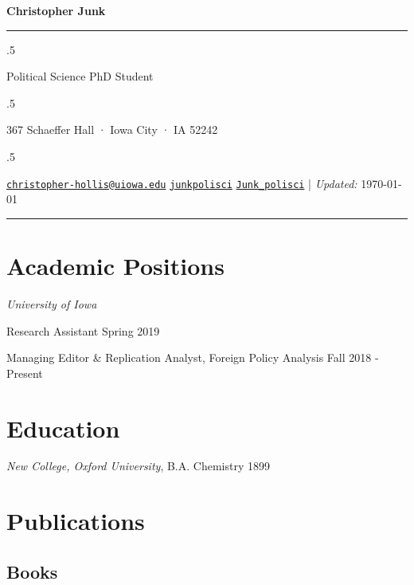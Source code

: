 \documentclass[11pt,]{article}
\begin{document}
\centerline{\huge \bf Christopher Junk}

\vspace{2 mm}

\hrule

\vspace{2 mm}

\moveleft.5\hoffset\centerline{Political Science PhD Student}
\moveleft.5\hoffset\centerline{367 Schaeffer Hall · Iowa City · IA 52242}
\moveleft.5\hoffset\centerline{ \faEnvelopeO \hspace{1 mm} \href{mailto:}{\tt \href{mailto:christopher-hollis@uiowa.edu}{\nolinkurl{christopher-hollis@uiowa.edu}}} \hspace{1 mm}  \faGithub \hspace{1 mm} \href{http://github.com/junkpolisci}{\tt junkpolisci} \hspace{1 mm}   \faTwitter \hspace{1 mm} \href{https:/twitter.com/Junk\_polisci}{\tt Junk\_polisci} \hspace{1 mm}    | \emph{Updated:} \today}

\vspace{2 mm}

\hrule


\section{Academic Positions}\label{academic-positions}

\emph{University of Iowa}

Research Assistant \hfill Spring 2019

Managing Editor \& Replication Analyst, Foreign Policy Analysis
\hfill Fall 2018 - Present

\section{Education}\label{education}

\emph{New College, Oxford University}, B.A. Chemistry \hfill 1899

\section{Publications}\label{publications}

\subsection{Books}\label{books}
\end{document}
